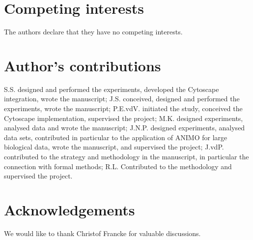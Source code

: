 \documentclass{bmcart}
\begin{document}
\begin{backmatter}

\section*{Competing interests}
The authors declare that they have no competing interests.

\section*{Author's contributions}
S.S. designed and performed the experiments, developed the Cytoscape integration, wrote the manuscript;
J.S. conceived, designed and performed the experiments, wrote the manuscript;
P.E.vdV. initiated the study, conceived the Cytoscape implementation, supervised the project;
M.K. designed experiments, analysed data and wrote the manuscript;
J.N.P. designed experiments, analysed data sets, contributed in particular to the application of ANIMO for large biological data, wrote the manuscript, and supervised the project;
J.vdP. contributed to the strategy and methodology in the manuscript, in particular the connection with formal methods;
R.L. Contributed to the methodology and supervised the project.

\section*{Acknowledgements}
We would like to thank Christof Francke for valuable discussions.


\end{backmatter}
\end{document}

